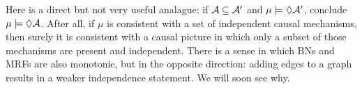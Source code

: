 Here is a direct but not very useful analague: if $\mathcal A \subseteq \mathcal A'$ and $\mu \models \Diamond\mathcal A'$, conclude $\mu \models \Diamond\mathcal A$. 
%
After all, if 
$\mu$ is consistent with a set of independent causal mechanisms, then surely 
it is
consistent with a causal picture
in which
only a subset of those mechanisms 
are
present and independent.  
{%
There is a sense in which 
    BNs and MRFs are also monotonic,
    but in the opposite direction:
    adding edges to a graph results in a weaker
    independence statement.
    We will soon see why.
}%


